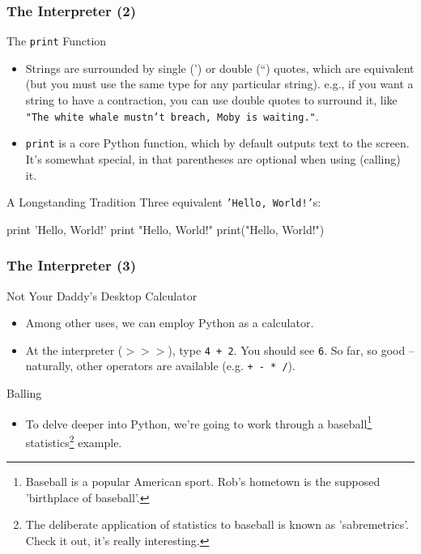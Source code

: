 \documentclass[10pt]{beamer}
\begin{document}
\begin{frame}[fragile]
  \frametitle{The Interpreter (2)}
  \begin{block}{The \texttt{print} Function}
    \begin{itemize}
      \item Strings are surrounded by single (') or double (``) quotes, which are equivalent (but you must use the same type for any particular string).
        e.g., if you want a string to have a contraction, you can use double quotes to surround it, like \texttt{"The white whale mustn't breach, Moby is waiting."}.
      \item \texttt{print} is a core Python function, which by default outputs text to the screen. It's somewhat special, in that parentheses are optional when using (calling) it.
    \end{itemize}
  \end{block}
  \begin{block}{A Longstanding Tradition}
      Three equivalent \texttt{'Hello, World!'}s:
      \begin{pythoncode}
  print 'Hello, World!'
  print "Hello, World!"
  print("Hello, World!")
      \end{pythoncode}
  \end{block}
\end{frame}

\begin{frame}
  \frametitle{The Interpreter (3)}
  \begin{block}{Not Your Daddy's Desktop Calculator}
    \begin{itemize}
      \item Among other uses, we can employ Python as a calculator.
      \item At the interpreter (\texttt{$>>>$}), type \texttt{4 + 2}.
        You should see \texttt{6}.
        So far, so good -- naturally, other operators are available (e.g. \texttt{+ - * /}).
    \end{itemize}
  \end{block}
  \begin{block}{Balling}
    \begin{itemize}
      \item To delve deeper into Python, we're going to work through a baseball\footnote{Baseball is a popular American sport. Rob's hometown is the supposed 'birthplace of baseball'.} statistics\footnote{The deliberate application of statistics to baseball is known as 'sabremetrics'. Check it out, it's really interesting.} example.
    \end{itemize}
  \end{block}
\end{frame}
\end{document}
